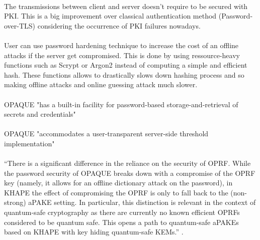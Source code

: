 \documentclass[../report.tex]{subfiles}
\begin{document}
\paragraph{}
The transmissions between client and server doesn't require to be secured with PKI. This is a big improvement over classical authentication method (Password-over-TLS) considering the occurrence of PKI failures nowadays. %

\paragraph{}
User can use password hardening technique to increase the cost of an offline attacks if the server get compromised. This is done by using ressource-heavy functions such as Scrypt \cite{Scrypt_Paper} or Argon2 \cite{Argon2_Paper} instead of computing a simple and efficient hash. These functions allows to drastically slows down hashing process and so making offline attacks and online guessing attack much slower.

\paragraph{}
OPAQUE "has a built-in facility for password-based storage-and-retrieval of secrets and credentials"

\paragraph{}
OPAQUE "accommodates a user-transparent server-side threshold implementation"

\paragraph{}
``There is a significant difference in the reliance on the security of
OPRF. While the password security of OPAQUE breaks down with a
compromise of the OPRF key (namely, it allows for an offline dictionary attack
on the password), in KHAPE the effect of compromising the OPRF is only to
fall back to the (non-strong) aPAKE setting. In particular, this distinction is
relevant in the context of quantum-safe cryptography as there are currently no
known efficient OPRFs considered to be quantum safe. This opens a path to
quantum-safe aPAKEs based on KHAPE with key hiding quantum-safe KEMs.'' \cite{OPAQUE_Paper}.
\end{document}
